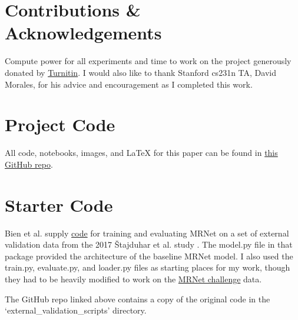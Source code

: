 \documentclass[10pt,twocolumn,letterpaper]{article}
\begin{document}
\appendix

\section{Contributions \& Acknowledgements}

Compute power for all experiments and time to work on the project generously donated by \href{https://www.turnitin.com/}{Turnitin}. I would also like to thank Stanford cs231n TA, David Morales, for his advice and encouragement as I completed this work.

\section{Project Code}

All code, notebooks, images, and LaTeX for this paper can be found in \href{https://github.com/FragLegs/mrnet}{this GitHub repo}.

\section{Starter Code}

Bien et al. supply \href{https://journals.plos.org/plosmedicine/article/file?type=supplementary&id=info:doi/10.1371/journal.pmed.1002699.s001}{code} for training and evaluating MRNet on a set of external
validation data from the 2017 Štajduhar et al. study \cite{vstajduhar2017semi}. The model.py file in that package provided the architecture of the baseline MRNet model. I also used the train.py, evaluate.py, and loader.py files as starting places for my work, though they had to be heavily modified to work on the \href{https://stanfordmlgroup.github.io/competitions/mrnet/}{MRNet challenge} data.

The GitHub repo linked above contains a copy of the original code in the `external\_validation\_scripts' directory.




\end{document}
